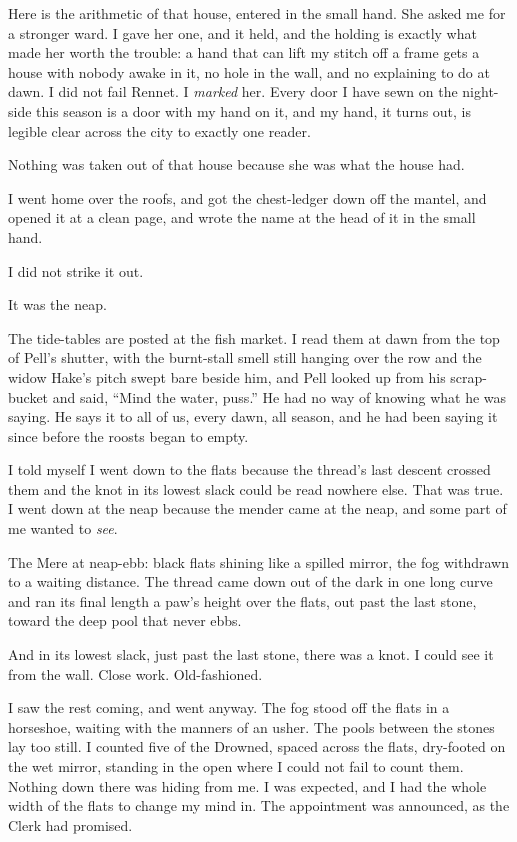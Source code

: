 Here is the arithmetic of that house, entered in the small hand. She asked me for a stronger ward. I gave her one, and it held, and the holding is exactly what made her worth the trouble: a hand that can lift my stitch off a frame gets a house with nobody awake in it, no hole in the wall, and no explaining to do at dawn. I did not fail Rennet. I \emph{marked} her. Every door I have sewn on the night-side this season is a door with my hand on it, and my hand, it turns out, is legible clear across the city to exactly one reader.

Nothing was taken out of that house because she was what the house had.

I went home over the roofs, and got the chest-ledger down off the mantel, and opened it at a clean page, and wrote the name at the head of it in the small hand.

I did not strike it out.

\scenebreak

It was the neap.

The tide-tables are posted at the fish market. I read them at dawn from the top of Pell's shutter, with the burnt-stall smell still hanging over the row and the widow Hake's pitch swept bare beside him, and Pell looked up from his scrap-bucket and said, ``Mind the water, puss.'' He had no way of knowing what he was saying. He says it to all of us, every dawn, all season, and he had been saying it since before the roosts began to empty.

I told myself I went down to the flats because the thread's last descent crossed them and the knot in its lowest slack could be read nowhere else. That was true. I went down at the neap because the mender came at the neap, and some part of me wanted to \emph{see}.

The Mere at neap-ebb: black flats shining like a spilled mirror, the fog withdrawn to a waiting distance. The thread came down out of the dark in one long curve and ran its final length a paw's height over the flats, out past the last stone, toward the deep pool that never ebbs.

And in its lowest slack, just past the last stone, there was a knot. I could see it from the wall. Close work. Old-fashioned.

I saw the rest coming, and went anyway. The fog stood off the flats in a horseshoe, waiting with the manners of an usher. The pools between the stones lay too still. I counted five of the Drowned, spaced across the flats, dry-footed on the wet mirror, standing in the open where I could not fail to count them. Nothing down there was hiding from me. I was expected, and I had the whole width of the flats to change my mind in. The appointment was announced, as the Clerk had promised.

